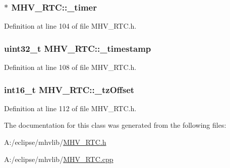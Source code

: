 \hypertarget{class_m_h_v___r_t_c_a394402df903b8eb7e51c415c30cb7057}{
\subsubsection[{\-\_\-timer}]{$\ast$ {\bf \-M\-H\-V\-\_\-\-R\-T\-C\-::\-\_\-timer}}}
\label{class_m_h_v___r_t_c_a394402df903b8eb7e51c415c30cb7057}


\-Definition at line 104 of file \-M\-H\-V\-\_\-\-R\-T\-C.\-h.

\hypertarget{class_m_h_v___r_t_c_a6ac0d6f1b8985cd6113249693da50104}{
\subsubsection[{\-\_\-timestamp}]{\setlength{\rightskip}{0pt plus 5cm}uint32\-\_\-t {\bf \-M\-H\-V\-\_\-\-R\-T\-C\-::\-\_\-timestamp}}}
\label{class_m_h_v___r_t_c_a6ac0d6f1b8985cd6113249693da50104}


\-Definition at line 108 of file \-M\-H\-V\-\_\-\-R\-T\-C.\-h.

\hypertarget{class_m_h_v___r_t_c_af9e544307713892ec196261247213490}{
\subsubsection[{\-\_\-tz\-Offset}]{\setlength{\rightskip}{0pt plus 5cm}int16\-\_\-t {\bf \-M\-H\-V\-\_\-\-R\-T\-C\-::\-\_\-tz\-Offset}}}
\label{class_m_h_v___r_t_c_af9e544307713892ec196261247213490}


\-Definition at line 112 of file \-M\-H\-V\-\_\-\-R\-T\-C.\-h.



\-The documentation for this class was generated from the following files\-:\begin{DoxyCompactItemize}
\item 
\-A\-:/eclipse/mhvlib/\hyperlink{_m_h_v___r_t_c_8h}{\-M\-H\-V\-\_\-\-R\-T\-C.\-h}\item 
\-A\-:/eclipse/mhvlib/\hyperlink{_m_h_v___r_t_c_8cpp}{\-M\-H\-V\-\_\-\-R\-T\-C.\-cpp}\end{DoxyCompactItemize}

